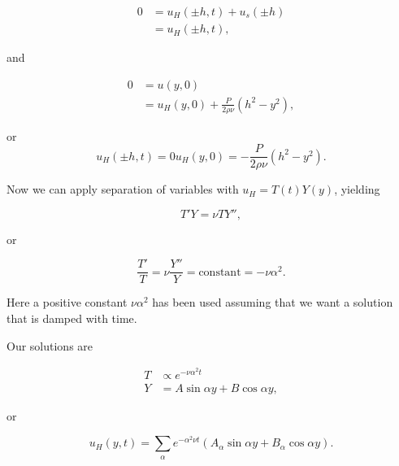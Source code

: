 \begin{align*}
0 
&= u_H(\pm h, t) + u_s(\pm h) \\
&= u_H(\pm h, t),
\end{align*}

and 

\begin{align*}
0 
&= u(y, 0) \\
&= u_H(y, 0) + \frac{P}{2 \rho \nu} \left( h^2 - y^2 \right),
\end{align*}

or
\begin{subequations}
\begin{equation}\label{eqn:channelFlowWithStepPressureGradient:290}
u_H(\pm h, t) = 0
\end{equation}
\begin{equation}\label{eqn:channelFlowWithStepPressureGradient:310}
u_H(y, 0) = -\frac{P}{2 \rho \nu} \left( h^2 - y^2 \right).
\end{equation}
\end{subequations}

Now we can apply separation of variables with $u_H = T(t) Y(y)$, yielding

\begin{equation}\label{eqn:channelFlowWithStepPressureGradient:150b}
T' Y = \nu T Y'',
\end{equation}

or 

\begin{equation}\label{eqn:channelFlowWithStepPressureGradient:330}
\frac{T'}{T} = \nu \frac{Y''}{Y} = \text{constant} = - \nu \alpha^2.
\end{equation}

Here a positive constant $\nu \alpha^2$ has been used assuming that we want a solution that is damped with time.

Our solutions are

\begin{align}\label{eqn:channelFlowWithStepPressureGradient:350}
T &\propto e^{- \nu \alpha^2 t} \\
Y &= A \sin \alpha y + B \cos\alpha y,
\end{align}

or

\begin{equation}\label{eqn:channelFlowWithStepPressureGradient:370}
u_H(y, t) = \sum_\alpha e^{-\alpha^2 \nu t} \left( A_\alpha \sin \alpha y + B_\alpha \cos\alpha y \right).
\end{equation}

